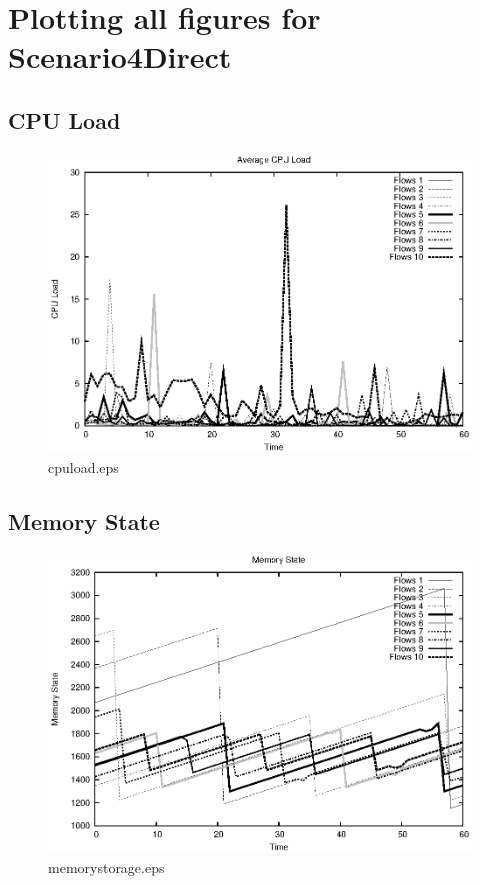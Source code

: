 \documentclass{elsart}
\begin{document}
\section{Plotting all figures for Scenario4Direct}
\subsection{CPU Load}

\begin{figure}[ht]
\centering
\includegraphics{Scenario4Direct/cpuload.eps}
\caption{cpuload.eps}\label{fig:cpuload}
\end{figure}

\clearpage
\subsection{Memory State}

\begin{figure}[ht]
\centering
\includegraphics{Scenario4Direct/memorystorage.eps}
\caption{memorystorage.eps}\label{fig:memorystorage}
\end{figure}
\end{document}
